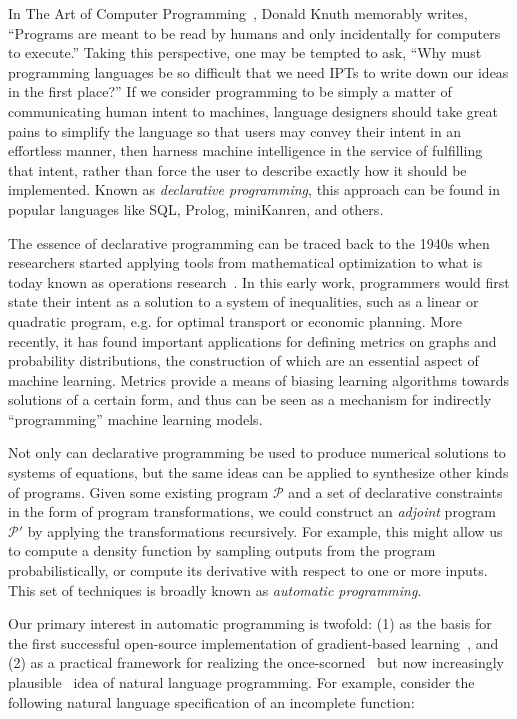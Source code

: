 \documentclass[10pt]{article}
\begin{document}
In The Art of Computer Programming~\cite{knuth1997art}, Donald Knuth memorably writes, ``Programs are meant to be read by humans and only incidentally for computers to execute.'' Taking this perspective, one may be tempted to ask, ``Why must programming languages be so difficult that we need IPTs to write down our ideas in the first place?'' If we consider programming to be simply a matter of communicating human intent to machines, language designers should take great pains to simplify the language so that users may convey their intent in an effortless manner, then harness machine intelligence in the service of fulfilling that intent, rather than force the user to describe exactly how it should be implemented. Known as \textit{declarative programming}, this approach can be found in popular languages like SQL, Prolog, miniKanren, and others.

The essence of declarative programming can be traced back to the 1940s when researchers started applying tools from mathematical optimization to what is today known as operations research~\cite{kantorovich1960mathematical}. In this early work, programmers would first state their intent as a solution to a system of inequalities, such as a linear or quadratic program, e.g. for optimal transport or economic planning. More recently, it has found important applications for defining metrics on graphs and probability distributions, the construction of which are an essential aspect of machine learning. Metrics provide a means of biasing learning algorithms towards solutions of a certain form, and thus can be seen as a mechanism for indirectly ``programming'' machine learning models.

Not only can declarative programming be used to produce numerical solutions to systems of equations, but the same ideas can be applied to synthesize other kinds of programs. Given some existing program $\mathcal P$ and a set of declarative constraints in the form of program transformations, we could construct an \textit{adjoint} program $\mathcal P'$ by applying the transformations recursively. For example, this might allow us to compute a density function by sampling outputs from the program probabilistically, or compute its derivative with respect to one or more inputs. This set of techniques is broadly known as \textit{automatic programming}.

Our primary interest in automatic programming is twofold: (1) as the basis for the first successful open-source implementation of gradient-based learning~\cite{baydin2018automatic}, and (2) as a practical framework for realizing the once-scorned~\cite{dijkstra1979foolishness} but now increasingly plausible~\cite{chen2021evaluating} idea of natural language programming. For example, consider the following natural language specification of an incomplete function:
\end{document}
